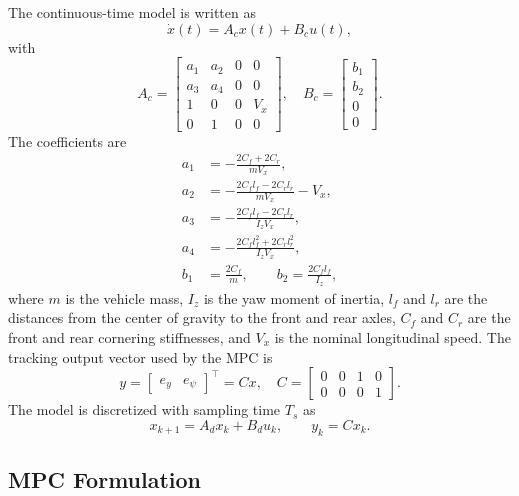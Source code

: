 \documentclass[10pt,twocolumn]{ICCAS}
\begin{document}
The continuous-time model is written as
\begin{equation}
\dot{x}(t) = A_c x(t) + B_c u(t),
\label{eq:continuous_model}
\end{equation}
with
\begin{equation}
A_c =
\begin{bmatrix}
a_1 & a_2 & 0 & 0 \\
a_3 & a_4 & 0 & 0 \\
1   & 0   & 0 & V_x \\
0   & 1   & 0 & 0
\end{bmatrix},
\quad
B_c =
\begin{bmatrix}
b_1 \\ b_2 \\ 0 \\ 0
\end{bmatrix}.
\label{eq:continuous_matrices}
\end{equation}
The coefficients are
\begin{align}
a_1 &= -\frac{2C_f+2C_r}{mV_x}, \nonumber\\
a_2 &= -\frac{2C_f l_f-2C_r l_r}{mV_x} - V_x, \nonumber\\
a_3 &= -\frac{2C_f l_f-2C_r l_r}{I_z V_x}, \nonumber\\
a_4 &= -\frac{2C_f l_f^2+2C_r l_r^2}{I_z V_x}, \nonumber\\
b_1 &= \frac{2C_f}{m}, \qquad
b_2 = \frac{2C_f l_f}{I_z},
\label{eq:model_coefficients}
\end{align}
where $m$ is the vehicle mass, $I_z$ is the yaw moment of inertia, $l_f$ and
$l_r$ are the distances from the center of gravity to the front and rear axles,
$C_f$ and $C_r$ are the front and rear cornering stiffnesses, and $V_x$ is the
nominal longitudinal speed. The tracking output vector used by the MPC is
\begin{equation}
y =
\begin{bmatrix}
e_y & e_\psi
\end{bmatrix}^{\top}
= Cx,
\quad
C =
\begin{bmatrix}
0 & 0 & 1 & 0 \\
0 & 0 & 0 & 1
\end{bmatrix}.
\label{eq:output_equation}
\end{equation}
The model is discretized with sampling time $T_s$ as
\begin{equation}
x_{k+1} = A_d x_k + B_d u_k,\qquad y_k = Cx_k.
\label{eq:discrete_model}
\end{equation}
\subsection{MPC Formulation}
\label{subsec:mpc_formulation}
\end{document}

